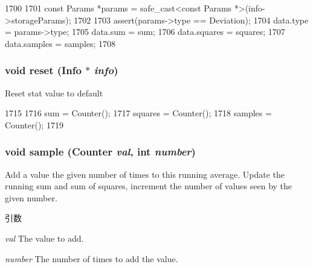\begin{DoxyCode}
1700     {
1701         const Params *params = safe_cast<const Params *>(info->storageParams);
1702 
1703         assert(params->type == Deviation);
1704         data.type = params->type;
1705         data.sum = sum;
1706         data.squares = squares;
1707         data.samples = samples;
1708     }
\end{DoxyCode}
\hypertarget{classStats_1_1SampleStor_a10d9d71be6e0d2194999bb5dd5280e2d}{
\subsubsection[{reset}]{\setlength{\rightskip}{0pt plus 5cm}void reset ({\bf Info} $\ast$ {\em info})}}
\label{classStats_1_1SampleStor_a10d9d71be6e0d2194999bb5dd5280e2d}
Reset stat value to default 


\begin{DoxyCode}
1715     {
1716         sum = Counter();
1717         squares = Counter();
1718         samples = Counter();
1719     }
\end{DoxyCode}
\hypertarget{classStats_1_1SampleStor_a57fea70de4ed8fee9ec9e9d9cca6f9fa}{
\subsubsection[{sample}]{\setlength{\rightskip}{0pt plus 5cm}void sample ({\bf Counter} {\em val}, \/  int {\em number})}}
\label{classStats_1_1SampleStor_a57fea70de4ed8fee9ec9e9d9cca6f9fa}
Add a value the given number of times to this running average. Update the running sum and sum of squares, increment the number of values seen by the given number. 
\begin{DoxyParams}{引数}
\item[{\em val}]The value to add. \item[{\em number}]The number of times to add the value. \end{DoxyParams}



